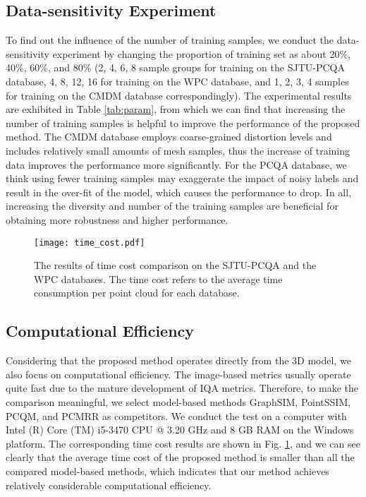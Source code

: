 \documentclass[lettersize,journal]{IEEEtran}
\begin{document}
\subsection{Data-sensitivity Experiment}
{ To find out the influence of the number of training samples, we conduct the data-sensitivity experiment by changing the proportion of training set as about 20\%, 40\%, 60\%, and 80\% (2, 4, 6, 8 sample groups for training on the SJTU-PCQA database, 4, 8, 12, 16 for training on the WPC database, and 1, 2, 3, 4 samples for training on the CMDM database correspondingly). The experimental results are exhibited in Table \ref{tab:param}, from which we can find that increasing the number of training samples is helpful to improve the performance of the proposed method. The CMDM database employs coarse-grained distortion levels and includes relatively small amounts of mesh samples, thus the increase of training data improves the performance more significantly. For the PCQA database, we think using fewer training samples may exaggerate the impact of noisy labels and result in the over-fit of the model, which causes the performance to drop. In all, increasing the diversity and number of the training samples are beneficial for obtaining more robustness and higher performance. }













 

   




\begin{figure}
    \centering
    \texttt{[image: time\_cost.pdf]}
\caption{The results of time cost comparison on the SJTU-PCQA and the WPC databases. The time cost refers to the average time consumption per point cloud for each database.}
    \label{fig:time}
    \vspace{-0.3cm}
\end{figure}




\subsection{Computational Efficiency}
Considering that the proposed method operates directly from the 3D model, we also focus on computational efficiency. The image-based metrics usually operate quite fast due to the mature development of IQA metrics. Therefore, to make the comparison meaningful, we select model-based methods GraphSIM, PointSSIM, PCQM, and PCMRR as competitors. We conduct the test on a computer with Intel (R) Core (TM) i5-3470 CPU @ 3.20 GHz and 8 GB RAM on the Windows platform. The corresponding time cost results are shown in Fig. \ref{fig:time}, and we can see clearly that the average time cost of the proposed method is smaller than all the compared model-based methods, which indicates that our method achieves relatively considerable computational efficiency.
\end{document}
